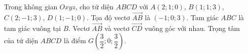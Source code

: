\begin{ex}
Trong không gian $Oxyz$, cho tứ diện $ABCD$ với $A(2;1;0)$, $B(1;1;3)$, $C(2;-1;3)$, $D(1;-1;0)$.
\choiceTF
{\True Tọa độ vectơ $\overrightarrow{AB}$ là $(-1;0;3)$.}
{Tam giác $ABC$ là tam giác vuông tại $B$.}
{Vectơ $\overrightarrow{AB}$ và vectơ $\overrightarrow{CD}$ vuông góc với nhau.}
{\True Trọng tâm của tứ diện $ABCD$ là điểm $G\left(\dfrac32;0;\dfrac32\right)$.}
\end{ex}
